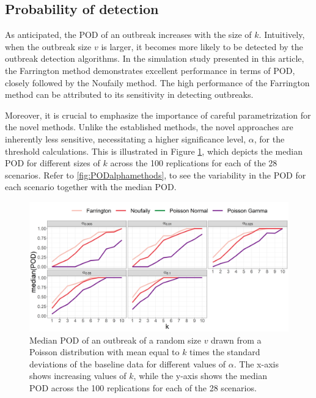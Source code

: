 \documentclass[preprint, 3p, authoryear]{elsarticle} %
\begin{document}
\hypertarget{probability-of-detection}{%
\subsection{Probability of detection}\label{probability-of-detection}}

As anticipated, the POD of an outbreak increases with the size of \(k\). Intuitively, when the outbreak size \(v\) is larger, it becomes more likely to be detected by the outbreak detection algorithms. In the simulation study presented in this article, the Farrington method demonstrates excellent performance in terms of POD, closely followed by the Noufaily method. The high performance of the Farrington method can be attributed to its sensitivity in detecting outbreaks.

Moreover, it is crucial to emphasize the importance of careful parametrization for the novel methods. Unlike the established methods, the novel approaches are inherently less sensitive, necessitating a higher significance level, \(\alpha\), for the threshold calculations. This is illustrated in Figure \ref{fig:PODalphamethodsmedian}, which depicts the median POD for different sizes of \(k\) across the 100 replications for each of the 28 scenarios. Refer to \ref{fig:PODalphamethods}, to see the variability in the POD for each scenario together with the median POD.



\begin{figure}[H]
\includegraphics[width=1\linewidth]{../../figures/POD_alpha_methods_median} \caption{Median POD of an outbreak of a random size \(v\) drawn from a Poisson distribution with mean equal to \(k\) times the standard deviations of the baseline data for different values of \(\alpha\). The x-axis shows increasing values of \(k\), while the y-axis shows the median POD across the 100 replications for each of the 28 scenarios.}\label{fig:PODalphamethodsmedian}
\end{figure}
\end{document}
